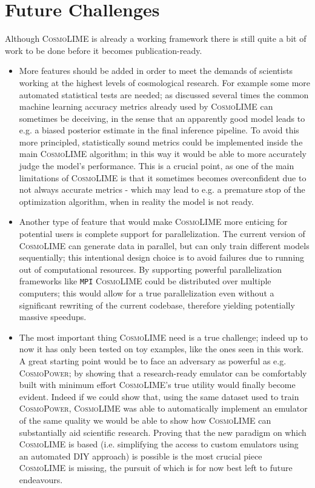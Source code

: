 \section{Future Challenges}
Although \textsc{CosmoLIME} is already a working framework there is still quite a bit of work to be done before it becomes publication-ready.
\begin{itemize}
    \item More features should be added in order to meet the demands of scientists working at the highest levels of cosmological research. For example some more automated statistical tests are needed; as discussed several times the common machine learning accuracy metrics already used by \textsc{CosmoLIME} can sometimes be deceiving, in the sense that an apparently good model leads to e.g. a biased posterior estimate in the final inference pipeline. To avoid this more principled, statistically sound metrics could be implemented inside the main \textsc{CosmoLIME} algorithm; in this way it would be able to more accurately judge the model's performance. This is a crucial point, as one of the main limitations of \textsc{CosmoLIME} is that it sometimes becomes overconfident due to not always accurate metrics - which may lead to e.g. a premature stop of the optimization algorithm, when in reality the model is not ready.
    \item Another type of feature that would make \textsc{CosmoLIME} more enticing for potential users is complete support for parallelization. The current version of \textsc{CosmoLIME} can generate data in parallel, but can only train different models sequentially; this intentional design choice is to avoid failures due to running out of computational resources. By supporting powerful parallelization frameworks like \texttt{MPI} \textsc{CosmoLIME} could be distributed over multiple computers; this would allow for a true parallelization even without a significant rewriting of the current codebase, therefore yielding potentially massive speedups.
    \item The most important thing \textsc{CosmoLIME} need is a true challenge; indeed up to now it has only been tested on toy examples, like the ones seen in this work. A great starting point would be to face an adversary as powerful as e.g. \textsc{CosmoPower}; by showing that a research-ready emulator can be comfortably built with minimum effort \textsc{CosmoLIME}'s true utility would finally become evident. Indeed if we could show that, using the same dataset used to train \textsc{CosmoPower}, \textsc{CosmoLIME} was able to automatically implement an emulator of the same quality we would be able to show how \textsc{CosmoLIME} can substantially aid scientific research. Proving that the new paradigm on which \textsc{CosmoLIME} is based (i.e. simplifying the access to custom emulators using an automated DIY approach) is possible is the most crucial piece \textsc{CosmoLIME} is missing, the pursuit of which is for now best left to future endeavours.
\end{itemize}